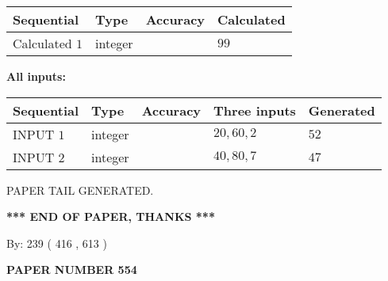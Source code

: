 \documentclass[12pt]{article}
\begin{document}
   
   
   
\noindent{}
   
   
  
  
\noindent\begin{tabular}{|l|l|l|l|}
\hline
 Sequential & Type & Accuracy & Calculated \\ 
\hline
 
 
  Calculated $  1 $ & integer &  & 
  $ 99 $ 
 \\  \hline  
 \end{tabular}
   
   
   
   
\noindent\vspace{0.1in}\hspace{-0.08in} {\textbf{\Large{All inputs: }}}
   
   
  
  
\noindent\begin{tabular}{|l|l|l|l|l|}
\hline
 Sequential & Type & Accuracy & Three inputs & Generated \\ 
\hline
 
 
  INPUT $  1 $ & integer &  & $
 20
 , 
 60
 , 
 2
 $ & $ 52 $ 
 \\  \hline  
 
 
  INPUT $  2 $ & integer &  & $
 40
 , 
 80
 , 
 7
 $ & $ 47 $ 
 \\  \hline  
 \end{tabular}
   
   
   
   
   
   
 \vspace{0.2in}
 
   
   
\vspace{2.0in} PAPER TAIL GENERATED.
   
   
   
   
\vspace{1.0in} 
{\textbf{\large{ *** END OF PAPER, THANKS *** }}} 
   
   
\hspace{1.0in} By: 
 239 ( 416 ,  613 )
   
   
   
   
\newpage 
\setcounter{page}{ 
   554001 } 
   
   
   
   
 {\textbf{ \Large{ PAPER NUMBER  554  }}}
   
\end{document}
